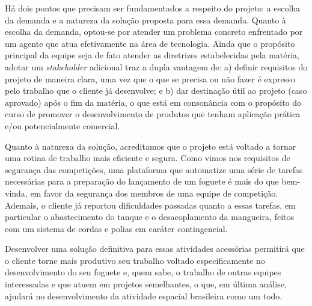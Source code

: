 \par Há dois pontos que precisam ser fundamentados a respeito do projeto: a escolha da demanda e a natureza da solução proposta para essa demanda. Quanto à escolha da demanda, optou-se por atender um problema concreto enfrentado por um agente que atua efetivamente na área de tecnologia. Ainda que o propósito principal da equipe seja de fato atender as diretrizes estabelecidas pela matéria, adotar um \textit{stakeholder} adicional traz a dupla vantagem de: a) definir requisitos do projeto de maneira clara, uma vez que o que se precisa ou não fazer é expresso pelo trabalho que o cliente já desenvolve; e b) dar destinação útil ao projeto (caso aprovado) após o fim da matéria, o que está em consonância com o propósito do curso de promover o desenvolvimento de produtos que tenham aplicação prática e/ou potencialmente comercial.

\par Quanto à natureza da solução, acreditamos que o projeto está voltado a tornar uma rotina de trabalho mais eficiente e segura. Como vimos nos requisitos de segurança das competições, uma plataforma que automatize uma série de tarefas necessárias para a preparação do lançamento de um foguete é mais do que bem-vinda, em favor da segurança dos membros de uma equipe de competição. Ademais, o cliente já reportou dificuldades passadas quanto a essas tarefas, em particular o abastecimento do tanque e o desacoplamento da mangueira, feitos com um sistema de cordas e polias em caráter contingencial. 

\par Desenvolver uma solução definitiva para essas atividades acessórias permitirá que o cliente torne mais produtivo seu trabalho voltado especificamente no desenvolvimento do seu foguete e, quem sabe, o trabalho de outras equipes interessadas e que atuem em projetos semelhantes, o que, em última análise, ajudará no desenvolvimento da atividade espacial brasileira como um todo.